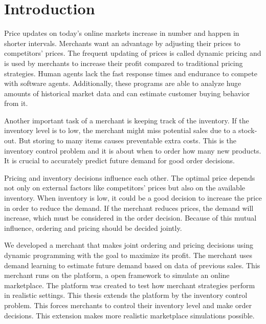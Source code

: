 
\chapter{Introduction}
Price updates on today's online markets increase in number and happen in shorter intervals.
Merchants want an advantage by adjusting their prices to competitors' prices.
The frequent updating of prices is called dynamic pricing and is used by merchants to increase their profit compared to traditional pricing strategies.
Human agents lack the fast response times and endurance to compete with software agents.
Additionally, these programs are able to analyze huge amounts of historical market data and can estimate customer buying behavior from it.

Another important task of a merchant is keeping track of the inventory.
If the inventory level is to low, the merchant might miss potential sales due to a stock-out.
But storing to many items causes preventable extra costs.
This is the inventory control problem and it is about when to order how many new products.
It is crucial to accurately predict future demand for good order decisions.

Pricing and inventory decisions influence each other.
The optimal price depends not only on external factors like competitors' prices but also on the available inventory.
When inventory is low, it could be a good decision to increase the price in order to reduce the demand.
If the merchant reduces prices, the demand will increase, which must be considered in the order decision.
Because of this mutual influence, ordering and pricing should be decided jointly.

We developed a merchant that makes joint ordering and pricing decisions using dynamic programming with the goal to maximize its profit.
The merchant uses demand learning to estimate future demand based on data of previous sales.
This merchant runs on the \pricewars platform, a open framework to simulate an online marketplace.
The platform was created to test how merchant strategies perform in realistic settings.
This thesis extends the platform by the inventory control problem.
This forces merchants to control their inventory level and make order decisions.
This extension makes more realistic marketplace simulations possible.


